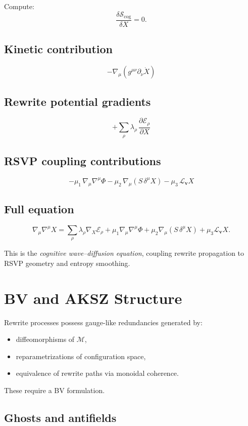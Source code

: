 Compute:
\[
\frac{\delta\mathcal{S}_{\mathrm{cog}}}{\delta X}
=
0.
\]

\subsection{Kinetic contribution}
\[
-\nabla_\mu \left( g^{\mu\nu} \partial_\nu \dot{X} \right)
\]

\subsection{Rewrite potential gradients}
\[
+\sum_{\rho} \lambda_\rho \,\frac{\partial \mathcal{E}_\rho}{\partial X}
\]

\subsection{RSVP coupling contributions}
\[
-\mu_1\,\nabla_\mu\nabla^\mu \Phi
-\mu_2\,\nabla_\mu(S\,\delta^\mu X)
-\mu_3\,\mathcal{L}_{\mathbf{v}} X
\]

\subsection{Full equation}

\[
\nabla_\mu \nabla^\mu X
=
\sum_{\rho} \lambda_\rho \nabla_X \mathcal{E}_\rho
+
\mu_1 \nabla_\mu\nabla^\mu \Phi
+
\mu_2 \nabla_\mu(S\,\delta^\mu X)
+
\mu_3 \mathcal{L}_{\mathbf{v}}X.
\]

This is the \emph{cognitive wave--diffusion equation}, coupling rewrite
propagation to RSVP geometry and entropy smoothing.

\section{BV and AKSZ Structure}

Rewrite processes possess gauge-like redundancies generated by:
\begin{itemize}
  \item diffeomorphisms of $\mathcal{M}$,
  \item reparametrizations of configuration space,
  \item equivalence of rewrite paths via monoidal coherence.
\end{itemize}
These require a BV formulation.

\subsection{Ghosts and antifields}

